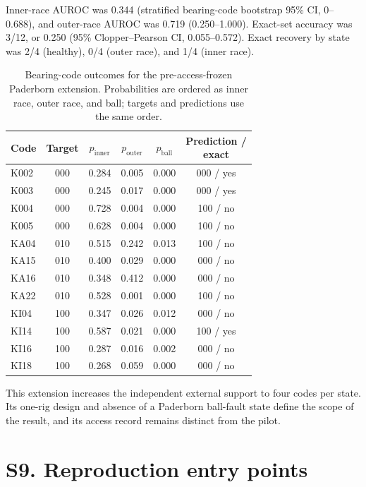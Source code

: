 \documentclass[11pt]{article}
\begin{document}
Inner-race AUROC was 0.344 (stratified bearing-code bootstrap 95\% CI, 0--0.688), and outer-race AUROC was 0.719 (0.250--1.000). Exact-set accuracy was 3/12, or 0.250 (95\% Clopper--Pearson CI, 0.055--0.572). Exact recovery by state was 2/4 (healthy), 0/4 (outer race), and 1/4 (inner race).

\begin{table}[htbp]
\centering
\small
\caption{Bearing-code outcomes for the pre-access-frozen Paderborn extension. Probabilities are ordered as inner race, outer race, and ball; targets and predictions use the same order.}
\label{tab:s-paderborn-extension}
\begin{tabular}{lccccc}
\toprule
Code & Target & $p_{\mathrm{inner}}$ & $p_{\mathrm{outer}}$ & $p_{\mathrm{ball}}$ & \shortstack{Prediction /\\exact} \\
\midrule
K002 & 000 & 0.284 & 0.005 & 0.000 & 000 / yes \\
K003 & 000 & 0.245 & 0.017 & 0.000 & 000 / yes \\
K004 & 000 & 0.728 & 0.004 & 0.000 & 100 / no \\
K005 & 000 & 0.628 & 0.004 & 0.000 & 100 / no \\
KA04 & 010 & 0.515 & 0.242 & 0.013 & 100 / no \\
KA15 & 010 & 0.400 & 0.029 & 0.000 & 000 / no \\
KA16 & 010 & 0.348 & 0.412 & 0.000 & 000 / no \\
KA22 & 010 & 0.528 & 0.001 & 0.000 & 100 / no \\
KI04 & 100 & 0.347 & 0.026 & 0.012 & 000 / no \\
KI14 & 100 & 0.587 & 0.021 & 0.000 & 100 / yes \\
KI16 & 100 & 0.287 & 0.016 & 0.002 & 000 / no \\
KI18 & 100 & 0.268 & 0.059 & 0.000 & 000 / no \\
\bottomrule
\end{tabular}
\end{table}

This extension increases the independent external support to four codes per state. Its one-rig design and absence of a Paderborn ball-fault state define the scope of the result, and its access record remains distinct from the pilot.

\section*{S9. Reproduction entry points}
\end{document}

